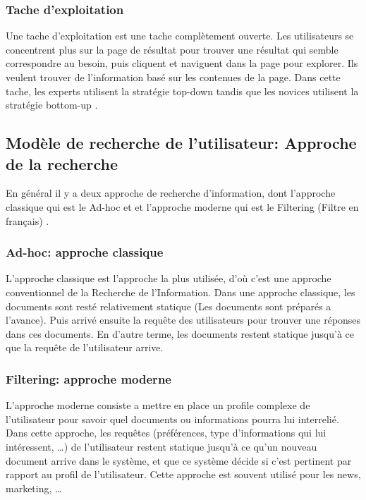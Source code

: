 \subsubsection{Tache d'exploitation}
Une tache d'exploitation est une tache complètement ouverte. Les utilisateurs se concentrent plus sur la page de résultat pour trouver une résultat qui semble correspondre au besoin, puis cliquent et naviguent dans la page pour explorer. Ils veulent trouver de l'information basé sur les contenues de la page. Dans cette tache, les experts utilisent la stratégie top-down tandis que les novices utilisent la stratégie bottom-up \citep{ri-sur-le-web}.

\subsection{Modèle de recherche de l'utilisateur: Approche de la recherche}
En général il y a deux approche de recherche d'information, dont l'approche classique qui est le Ad-hoc et et l'approche moderne qui est le Filtering (Filtre en français) \citep{modern-ir}.

\subsubsection{Ad-hoc: approche classique}
L'approche classique est l'approche la plus utilisée, d'où c'est une approche conventionnel de la Recherche de l'Information. Dans une approche classique, les documents sont resté relativement statique (Les documents sont préparés a l'avance). Puis arrivé ensuite la requête des utilisateurs pour trouver une réponses dans ces documents. En d'autre terme, les documents restent statique jusqu’à ce que la requête de l'utilisateur arrive.

\subsubsection{Filtering: approche moderne}
L'approche moderne consiste a mettre en place un profile complexe de l'utilisateur pour savoir quel documents ou informations pourra lui interrelié. Dans cette approche, les requêtes (préférences, type d'informations qui lui intéressent, \dots) de l'utilisateur restent statique jusqu’à ce qu'un nouveau document arrive dans le système, et que ce système décide si c'est pertinent par rapport au profil de l'utilisateur. Cette approche est souvent utilisé pour les news, marketing, \dots

